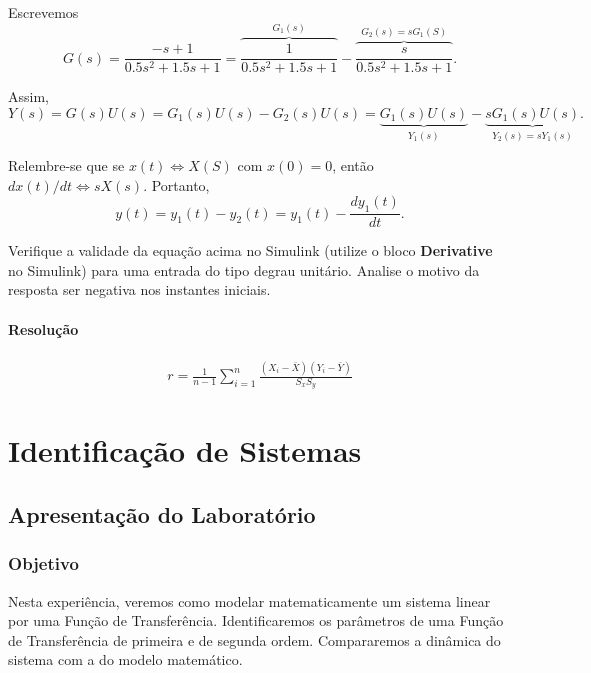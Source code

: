 \documentclass[
]{book}
\begin{document}
Escrevemos
\[
G(s) = \frac {-s+1}{0.5s^2+1.5s+1} = \overbrace{\frac {1}{0.5s^2+1.5s+1}}^{G_1(s)} - \overbrace{\frac {s}{0.5s^2+1.5s+1}}^{G_2(s) = sG_1(S)}.
\]

Assim,
\[
Y(s) = G(s)U(s) = G_1(s)U(s)-G_2(s)U(s) = \underbrace{G_1(s)U(s)}_{Y_1(s)} - \underbrace{sG_1(s)U(s)}_{Y_2(s) = sY_1(s)}.
\]

Relembre-se que se \(x(t) \iff X(S)\) com \(x(0) = 0\), então \(dx(t)/dt \iff sX(s)\). Portanto,
\[
y(t) = y_1(t)-y_2(t)=y_1(t)- \frac {dy_1(t)}{dt}.
\]

Verifique a validade da equação acima no Simulink (utilize o bloco \textbf{Derivative} no Simulink) para uma entrada do tipo degrau unitário. Analise o motivo da resposta ser negativa nos instantes iniciais.

\hypertarget{resoluuxe7uxe3o-5}{%
\subsubsection*{Resolução}\label{resoluuxe7uxe3o-5}}

\begin{align}
    r  = \frac{1}{n-1} \sum_{i=1}^{n} \frac{(X_i - \bar{X})(Y_i - \bar{Y})}{S_xS_y}
\end{align}

\hypertarget{identificauxe7uxe3o-de-sistemas}{%
\chapter{Identificação de Sistemas}\label{identificauxe7uxe3o-de-sistemas}}

\hypertarget{apresentauxe7uxe3o-do-laboratuxf3rio-1}{%
\section{Apresentação do Laboratório}\label{apresentauxe7uxe3o-do-laboratuxf3rio-1}}

\hypertarget{objetivo-1}{%
\subsection{Objetivo}\label{objetivo-1}}

Nesta experiência, veremos como modelar matematicamente um sistema linear por uma Função de Transferência. Identificaremos os parâmetros de uma Função de Transferência de primeira e de segunda ordem. Compararemos a dinâmica do sistema com a do modelo matemático.
\end{document}
